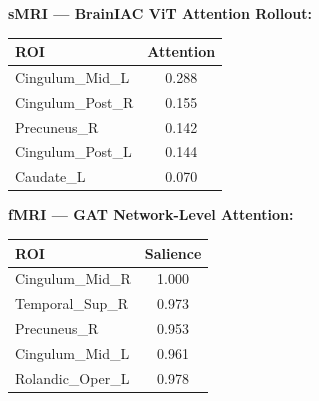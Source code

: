 \begin{figure}[t]
\begin{tcolorbox}
\vspace{4pt}

\begin{tcolorbox}[
  enhanced, colframe=gray!50, colback=gray!5,
  title={\small\textbf{(3) Multimodal Neural Evidence}},
  coltitle=black, fonttitle=\small\bfseries,
  top=2pt, bottom=2pt, left=3pt, right=3pt, boxrule=0.4pt, arc=2pt]
\small
\begin{minipage}[t]{0.47\textwidth}
\textbf{sMRI — BrainIAC ViT Attention Rollout:}\\[1pt]
\begin{tabular}{@{}lc@{}}
ROI & Attention\\
\hline
Cingulum\_Mid\_L & 0.288\\
Cingulum\_Post\_R & 0.155\\
Precuneus\_R & 0.142\\
Cingulum\_Post\_L & 0.144\\
Caudate\_L & 0.070\\
\end{tabular}
\end{minipage}
\hfill\vline\hfill
\begin{minipage}[t]{0.47\textwidth}
\textbf{fMRI — GAT Network-Level Attention:}\\[1pt]
\begin{tabular}{@{}lc@{}}
ROI & Salience\\
\hline
Cingulum\_Mid\_R & 1.000\\
Temporal\_Sup\_R & 0.973\\
Precuneus\_R & 0.953\\
Cingulum\_Mid\_L & 0.961\\
Rolandic\_Oper\_L & 0.978\\
\end{tabular}
\end{minipage}
\end{tcolorbox}

\vspace{4pt}


\end{tcolorbox}
\end{figure}
